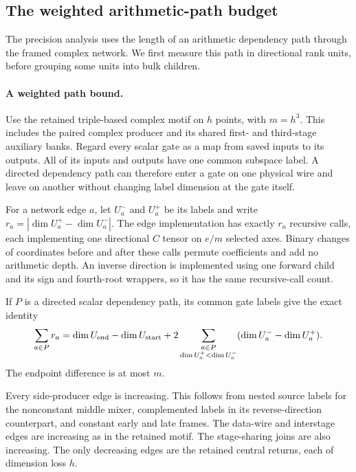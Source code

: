 \subsection{The weighted arithmetic-path budget}
\label{sec:pathwise-guard}

The precision analysis uses the length of an arithmetic dependency path
through the framed complex network. We first measure this path in
directional rank units, before grouping some units into bulk children.

\paragraph{A weighted path bound.}
Use the retained triple-based complex motif on $h$ points, with
$m=h^3$. This includes the paired complex producer and its shared
first- and third-stage auxiliary banks. Regard every scalar gate as a
map from saved inputs to its outputs. All of its inputs and outputs
have one common subspace label. A directed dependency path can therefore
enter a gate on one physical wire and leave on another without changing
label dimension at the gate itself.

For a network edge $a$, let $U_a^-$ and $U_a^+$ be its labels and write
$r_a=|\dim U_a^+-\dim U_a^-|$. The edge implementation has exactly
$r_a$ recursive calls, each implementing one directional $C$ tensor
on $e/m$ selected axes. Binary changes of coordinates before and after
these calls permute coefficients and add no arithmetic depth. An inverse
direction is implemented using one forward child and its sign and
fourth-root wrappers, so it has the same recursive-call count.

If $P$ is a directed scalar dependency path, its common gate labels give
the exact identity
\[
 \sum_{a\in P}r_a
 =\dim U_{\rm end}-\dim U_{\rm start}
   +2\sum_{\substack{a\in P\\\dim U_a^+<\dim U_a^-}}
       (\dim U_a^--\dim U_a^+).
\]
The endpoint difference is at most $m$.

Every side-producer edge is increasing. This follows from nested source
labels for the nonconstant middle mixer, complemented labels in its
reverse-direction counterpart, and constant early and late frames.
The data-wire and interstage edges are increasing as in the retained
motif. The stage-sharing joins are also increasing. The only decreasing
edges are the retained central returns, each of dimension loss $h$.

